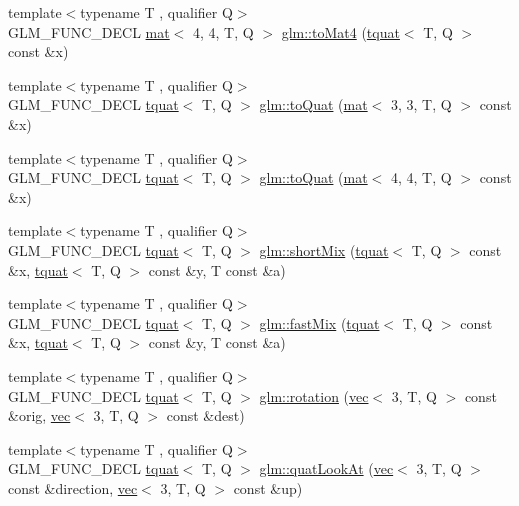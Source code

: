\begin{DoxyCompactItemize}
\item 
{\footnotesize template$<$typename T , qualifier Q$>$ }\\G\+L\+M\+\_\+\+F\+U\+N\+C\+\_\+\+D\+E\+CL \hyperlink{structglm_1_1mat}{mat}$<$ 4, 4, T, Q $>$ \hyperlink{group__gtx__quaternion_ga1fa0fb798c2715148e2e0358442bf895}{glm\+::to\+Mat4} (\hyperlink{structglm_1_1tquat}{tquat}$<$ T, Q $>$ const \&x)
\item 
{\footnotesize template$<$typename T , qualifier Q$>$ }\\G\+L\+M\+\_\+\+F\+U\+N\+C\+\_\+\+D\+E\+CL \hyperlink{structglm_1_1tquat}{tquat}$<$ T, Q $>$ \hyperlink{group__gtx__quaternion_gae9be791077b7a612d9092a922bd13f86}{glm\+::to\+Quat} (\hyperlink{structglm_1_1mat}{mat}$<$ 3, 3, T, Q $>$ const \&x)
\item 
{\footnotesize template$<$typename T , qualifier Q$>$ }\\G\+L\+M\+\_\+\+F\+U\+N\+C\+\_\+\+D\+E\+CL \hyperlink{structglm_1_1tquat}{tquat}$<$ T, Q $>$ \hyperlink{group__gtx__quaternion_ga6c0a178ac9c7d23e1a6848045d83aa54}{glm\+::to\+Quat} (\hyperlink{structglm_1_1mat}{mat}$<$ 4, 4, T, Q $>$ const \&x)
\item 
{\footnotesize template$<$typename T , qualifier Q$>$ }\\G\+L\+M\+\_\+\+F\+U\+N\+C\+\_\+\+D\+E\+CL \hyperlink{structglm_1_1tquat}{tquat}$<$ T, Q $>$ \hyperlink{group__gtx__quaternion_gaf0ad63ac791b1f9a587e363837c2d538}{glm\+::short\+Mix} (\hyperlink{structglm_1_1tquat}{tquat}$<$ T, Q $>$ const \&x, \hyperlink{structglm_1_1tquat}{tquat}$<$ T, Q $>$ const \&y, T const \&a)
\item 
{\footnotesize template$<$typename T , qualifier Q$>$ }\\G\+L\+M\+\_\+\+F\+U\+N\+C\+\_\+\+D\+E\+CL \hyperlink{structglm_1_1tquat}{tquat}$<$ T, Q $>$ \hyperlink{group__gtx__quaternion_gac5c77bc74dfc750aaf271d68f271bf2b}{glm\+::fast\+Mix} (\hyperlink{structglm_1_1tquat}{tquat}$<$ T, Q $>$ const \&x, \hyperlink{structglm_1_1tquat}{tquat}$<$ T, Q $>$ const \&y, T const \&a)
\item 
{\footnotesize template$<$typename T , qualifier Q$>$ }\\G\+L\+M\+\_\+\+F\+U\+N\+C\+\_\+\+D\+E\+CL \hyperlink{structglm_1_1tquat}{tquat}$<$ T, Q $>$ \hyperlink{group__gtx__quaternion_ga5a729f33cbd904c9ca14cdf25d0a07e4}{glm\+::rotation} (\hyperlink{structglm_1_1vec}{vec}$<$ 3, T, Q $>$ const \&orig, \hyperlink{structglm_1_1vec}{vec}$<$ 3, T, Q $>$ const \&dest)
\item 
{\footnotesize template$<$typename T , qualifier Q$>$ }\\G\+L\+M\+\_\+\+F\+U\+N\+C\+\_\+\+D\+E\+CL \hyperlink{structglm_1_1tquat}{tquat}$<$ T, Q $>$ \hyperlink{group__gtx__quaternion_ga668d9ec9964ced2b455d416677e1e8b9}{glm\+::quat\+Look\+At} (\hyperlink{structglm_1_1vec}{vec}$<$ 3, T, Q $>$ const \&direction, \hyperlink{structglm_1_1vec}{vec}$<$ 3, T, Q $>$ const \&up)

\end{DoxyCompactItemize}
